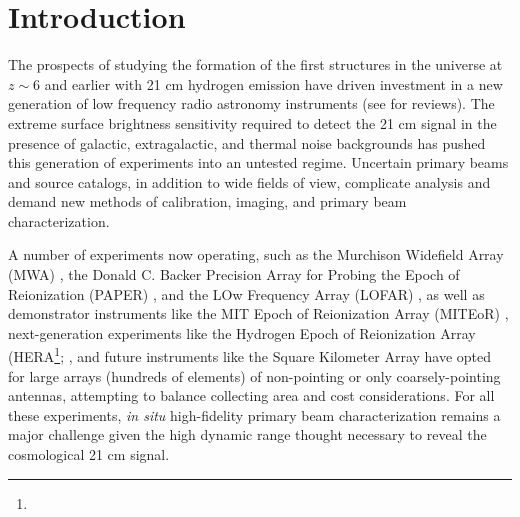 \section{Introduction}

The prospects of studying the formation of the first structures in the universe at $z\sim6$ and earlier with 21 cm hydrogen emission have driven investment in a new generation of low frequency radio astronomy instruments (see \citet{FurlanettoReview, miguelreview, PritchardLoebReview, aviBook, zaroubi} for reviews). The extreme surface brightness sensitivity required to detect the 21 cm signal in the presence of galactic, extragalactic, and thermal noise backgrounds has pushed this generation of experiments into an untested regime. Uncertain primary beams and source catalogs, in addition to wide fields of view, complicate analysis and demand new methods of calibration, imaging, and primary beam characterization. 

A number of experiments now operating, such as the Murchison Widefield Array (MWA) \citep{lonsdale09,tingay13,mwascience}, the Donald C. Backer Precision Array for Probing the Epoch of Reionization (PAPER) \citep{parsons14}, and the LOw Frequency Array (LOFAR) \citep{lofar}, as well as demonstrator instruments like the MIT Epoch of Reionization Array (MITEoR) \citep{zheng14}, next-generation experiments like the Hydrogen Epoch of Reionization Array (HERA\footnote{}; \citet{PoberNextGen}, and future instruments like the Square Kilometer Array \citep{ska} have opted for large arrays (hundreds of elements) of non-pointing or only coarsely-pointing antennas, attempting to balance collecting area and cost considerations. For all these experiments, \textit{in situ} high-fidelity primary beam characterization remains a major challenge given the high dynamic range \citep[e.g.][]{AaronSensitivity, beardsley13, nithya13, PoberNextGen} thought necessary to reveal the cosmological 21 cm signal. 

